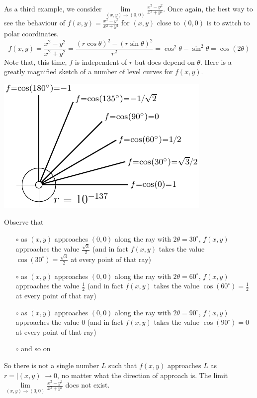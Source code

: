 \begin{eg}\label{ex LIMtwodC}
As a third example, we consider
$\lim\limits_{(x,y)\rightarrow (0,0)}\frac{x^2-y^2}{x^2+y^2}$.
Once again, the best way to see the behaviour of 
$f(x,y)=\frac{x^2-y^2}{x^2+y^2}$ for $(x,y)$ close to $(0,0)$ is to 
switch to polar coordinates.
$$
f(x,y)=\frac{x^2-y^2}{x^2+y^2}=\frac{(r\cos\theta)^2-(r\sin\theta)^2}{r^2}
  =\cos^2\theta-\sin^2\theta
  =\cos(2\theta)
$$
Note that, this time, $f$ is independent of $r$ but does depend on $\theta$.
Here is a greatly magnified sketch of a number of level curves for $f(x,y)$.
\begin{efig}
\begin{center}
   \includegraphics{polarD.pdf}
\end{center}
\end{efig}
Observe that
\begin{itemize}
\item[$\circ$] as $(x,y)$ approaches $(0,0)$ along the ray with 
$2\theta =30^\circ$, $f(x,y)$ approaches the value $\frac{\sqrt{3}}{2}$ 
(and in fact $f(x,y)$ takes the value $\cos(30^\circ)=\frac{\sqrt{3}}{2}$ 
at every point of that ray)
\item[$\circ$] as $(x,y)$ approaches $(0,0)$ along the ray with 
$2\theta =60^\circ$, $f(x,y)$ approaches the value $\frac{1}{2}$ 
(and in fact $f(x,y)$ takes the value $\cos(60^\circ)=\frac{1}{2}$ 
at every point of that ray)
\item[$\circ$] as $(x,y)$ approaches $(0,0)$ along the ray with 
$2\theta =90^\circ$, $f(x,y)$ approaches the value $0$ 
(and in fact $f(x,y)$ takes the value $\cos(90^\circ)=0$ 
at every point of that ray)
\item[$\circ$] and so on
\end{itemize}
So there is not a single number $L$ such that $f(x,y)$ approaches
$L$ as $r=|(x,y)|\rightarrow 0$, no matter what the direction of 
approach is. The limit 
$\lim\limits_{(x,y)\rightarrow (0,0)}\frac{x^2-y^2}{x^2+y^2}$
does not exist.



\end{eg}

